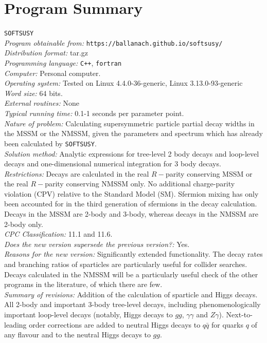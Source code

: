 \documentclass[final,3p,times]{elsarticle}
\def\SOFTSUSY{{\tt SOFTSUSY}}
\begin{document}
\section{Program Summary}
 \SOFTSUSY{} \\
{\em Program obtainable   from:} {\tt https://ballanach.github.io/softsusy/} \\
{\em Distribution format:}\/ tar.gz \\
{\em Programming language:} {\tt C++}, {\tt fortran} \\
{\em Computer:}\/ Personal computer. \\
{\em Operating system:}\/ Tested on Linux 4.4.0-36-generic, Linux 3.13.0-93-generic
\\
{\em Word size:}\/ 64 bits. \\
{\em External routines:}\/ None \\
{\em Typical running time:}\/ 0.1-1 seconds per parameter point. \\
{\em Nature of problem:}\/ Calculating supersymmetric particle partial decay
widths in the 
MSSM or the NMSSM\@, given the parameters and spectrum which has already been
calculated by \SOFTSUSY{}. \\
{\em Solution method:}\/ Analytic expressions for tree-level 2 body decays and loop-level decays and
one-dimensional numerical integration for 3 body decays.\\
{\em Restrictions:}\/ Decays are calculated in the real $R-$parity conserving
MSSM  or the real $R-$parity conserving
NMSSM only. No additional charge-parity violation (CPV) relative to the
Standard Model (SM). Sfermion mixing has only been accounted for in the third
generation of sfermions in the decay calculation. Decays in the MSSM are
2-body and 3-body, whereas decays in the NMSSM are 2-body only. \\
{\em CPC Classification:}\/ 11.1 and 11.6. \\
{\em Does the new version supersede the previous version?:}\/ Yes. \\
{\em Reasons for the new version:}\/ Significantly extended functionality. The
decay rates and branching ratios of sparticles are particularly useful for
collider searches. Decays calculated in the NMSSM will be a particularly
useful check of the other programs in the literature, of which there are few.\\
{\em Summary of revisions:}\/
Addition of the calculation of sparticle and Higgs decays. 
All 2-body and important 3-body tree-level
decays, including phenomenologically important loop-level decays (notably,
Higgs decays to $gg$, $\gamma \gamma$ and $Z \gamma$). Next-to-leading order corrections
are added to neutral Higgs  decays to $q \bar q$ for quarks $q$ of any flavour and to the neutral Higgs
decays to $gg$.
\end{document}

